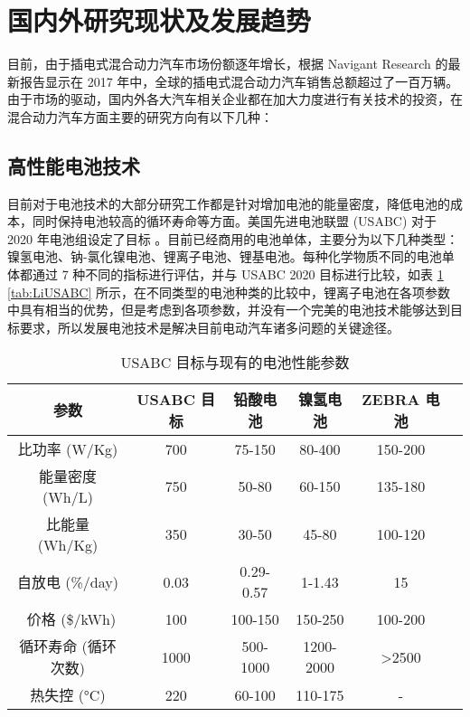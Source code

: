 \section{国内外研究现状及发展趋势}

目前，由于插电式混合动力汽车市场份额逐年增长，根据 Navigant Research 的最新报告显示在 2017 年中，全球的插电式混合动力汽车销售总额超过了一百万辆。由于市场的驱动，国内外各大汽车相关企业都在加大力度进行有关技术的投资，在混合动力汽车方面主要的研究方向有以下几种：


\subsection{高性能电池技术}

目前对于电池技术的大部分研究工作都是针对增加电池的能量密度，降低电池的成本，同时保持电池较高的循环寿命等方面。美国先进电池联盟 (USABC) 对于 2020 年电池组设定了目标 \cite{nengliangchucun}。目前已经商用的电池单体，主要分为以下几种类型：镍氢电池、钠-氯化镍电池、锂离子电池、锂基电池。每种化学物质不同的电池单体都通过 7 种不同的指标进行评估，并与 USABC 2020 目标进行比较，如表 \ref{tab:USABC} \ref{tab:LiUSABC} 所示，在不同类型的电池种类的比较中，锂离子电池在各项参数中具有相当的优势，但是考虑到各项参数，并没有一个完美的电池技术能够达到目标要求，所以发展电池技术是解决目前电动汽车诸多问题的关键途径。

\begin{table}
	\centering
	\caption{USABC 目标与现有的电池性能参数} \label{tab:USABC}
	\begin{tabular*}{0.9\textwidth}{@{\extracolsep{\fill}}cccccc}
		\toprule
		参数 & USABC 目标 & 铅酸电池 & 镍氢电池 & ZEBRA 电池\\
		\midrule
		比功率 (W/Kg)&700&75-150 &80-400&150-200 \\
		能量密度 (Wh/L)&750&50-80 &60-150 &135-180 \\
		比能量 (Wh/Kg)&350&30-50&45-80&100-120\\
		自放电 (\%/day)&0.03&0.29-0.57&1-1.43 &15\\\
		价格 (\$/kWh)&100&100-150 &150-250 &100-200\\
		循环寿命 (循环次数)&1000&500-1000 &1200-2000 &>2500\\
		热失控 (°C)&220&60-100 &110-175 & - \\
		\bottomrule
	\end{tabular*}
\end{table}

